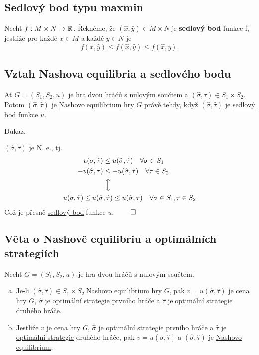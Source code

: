 \subsection{Sedlový bod typu maxmin}\label{sedlmax}
Nechť $f: M \times N \rightarrow \mathbb{R}$. Řekněme, že $(\hat x, \hat y) \in M \times N$ je \textbf{sedlový bod} funkce f, 
jestliže pro každé $x \in M$ a každé $y \in N$ je 
\[ 
    f(x, \hat y) \leq f(\hat x, \hat y) \leq f(\hat x, y).
\]
\newpage
\subsection{Vztah Nashova equilibria a sedlového bodu}
Ať $G = (S_1, S_2, u)$ je hra dvou hráčů s nulovým součtem a $(\hat \sigma, \hat \tau) \in S_1 \times S_2$. Potom 
$(\hat \sigma, \hat \tau)$ je \hyperref[nash]{Nashovo equilibrium} hry $G$ právě tehdy, když $(\hat \sigma, \hat \tau)$
je \hyperref[sedlmax]{sedlový bod} funkce $u$.

Důkaz.

$(\hat \sigma, \hat \tau)$ je N. e., tj. 
\begin{align*}
    u(\sigma, \hat \tau) &\leq u(\hat \sigma, \hat \tau) \quad \forall \sigma \in S_1 \\
    -u(\hat \sigma, \tau) &\leq -u(\hat \sigma, \hat \tau) \quad \forall \tau \in S_2 \\
    &\,\, \Big\Updownarrow \\
    u(\sigma, \hat \tau) \leq u (\hat \sigma&, \hat \tau) \leq u(\hat \sigma, \tau) \quad \forall \sigma \in S_1, \tau \in S_2
\end{align*}
Což je přesně \hyperref[sedlmax]{sedlový bod} funkce $u$. $\qed$

\subsection{Věta o Nashově equilibriu a optimálních strategiích}
Nechť $G = (S_1, S_2, u)$ je hra dvou hráčů s nulovým součtem.
\begin{enumerate}[(a)]
    \item Je-li $(\hat \sigma, \hat \tau) \in S_1 \times S_2$ \hyperref[nash]{Nashovo equilibrium} hry $G$, pak 
    $v = u(\hat \sigma, \hat \tau)$ je cena hry $G$, $\hat \sigma$ je \hyperref[optimalStrat]{optimální strategie} 
    prvního hráče a $\hat \tau$ je optimální strategie druhého hráče.
    \item Jestliže $v$ je cena hry $G$, $\hat \sigma$ je optimální strategie prvního hráče a $\hat \tau$ je 
    \hyperref[optimalStrat]{optimální strategie} druhého hráče, pak 
    $v = u(\hat \sigma, \hat \tau)$ a $(\hat \sigma, \hat \tau)$ je \hyperref[nash]{Nashovo equilibrium}.
\end{enumerate}
